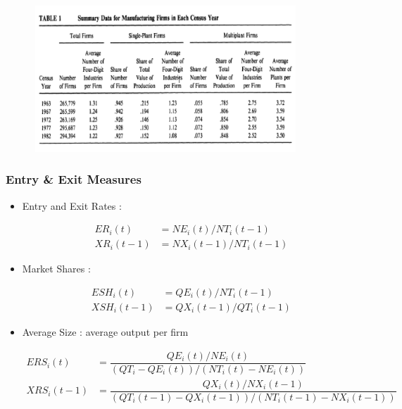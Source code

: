 \documentclass[dvipdfmx,12pt]{beamer}
\begin{document}
\begin{frame}

\begin{center}

\includegraphics[width=12cm,height=5.5cm]{DRS_T1.pdf}

\end{center}

\end{frame}

\begin{frame}\frametitle{Entry \& Exit Measures}

\footnotesize

 \begin{itemize}
 
 \item Entry and Exit Rates :
 
  \begin{align*}
  ER_i(t) &= NE_i(t)/NT_i(t-1) \\
  XR_i(t-1) & = NX_i(t-1) / NT_i(t-1)
  \end{align*} 
 
 \item Market Shares :
 
  \begin{align*}
  ESH_i(t) &=QE_i(t)/NT_i(t-1) \\
  XSH_i(t-1) &= QX_i(t-1) / QT_i(t-1)
  \end{align*}
 
 \item Average Size : average output per firm
 
  \begin{align*}
  ERS_i(t) &= \dfrac{QE_i(t)/NE_i(t)}{(QT_i-QE_i(t))/(NT_i(t) - NE_i(t))} \\
  XRS_i(t-1) &=\dfrac{QX_i(t)/NX_i(t-1)}{(QT_i(t-1)-QX_i(t-1))/(NT_i(t-1)-NX_i(t-1))}
  \end{align*}
 
 \end{itemize}

\large

\end{frame}
\end{document}
